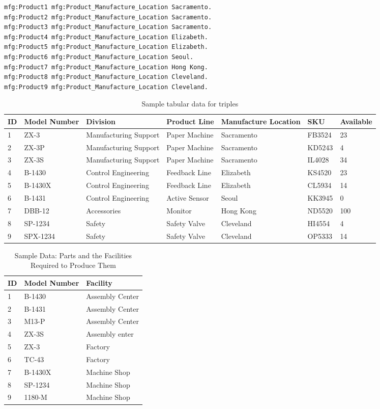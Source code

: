 \begin{lstlisting}
mfg:Product1 mfg:Product_Manufacture_Location Sacramento.
mfg:Product2 mfg:Product_Manufacture_Location Sacramento.
mfg:Product3 mfg:Product_Manufacture_Location Sacramento.
mfg:Product4 mfg:Product_Manufacture_Location Elizabeth.
mfg:Product5 mfg:Product_Manufacture_Location Elizabeth.
mfg:Product6 mfg:Product_Manufacture_Location Seoul.
mfg:Product7 mfg:Product_Manufacture_Location Hong Kong.
mfg:Product8 mfg:Product_Manufacture_Location Cleveland.
mfg:Product9 mfg:Product_Manufacture_Location Cleveland.
\end{lstlisting}


\begin{table}
\label{tab:ch9.1}
\caption{Sample tabular data for triples}
\begin{tabular}{|l l l l l l l|}
\hline
ID&Model Number&Division&Product Line&Manufacture Location&SKU&Available\\
\hline
1&ZX-3&Manufacturing Support&Paper Machine&Sacramento&FB3524&23\\
2&ZX-3P&Manufacturing Support&Paper Machine&Sacramento&KD5243&4\\
3&ZX-3S&Manufacturing Support&Paper Machine&Sacramento&IL4028&34\\
4&B-1430&Control Engineering&Feedback Line&Elizabeth&KS4520&23\\
5&B-1430X&Control Engineering&Feedback Line&Elizabeth&CL5934&14\\
6&B-1431&Control Engineering&Active Sensor&Seoul&KK3945&0\\
7&DBB-12&Accessories&Monitor&Hong Kong&ND5520&100\\
8&SP-1234&Safety&Safety Valve&Cleveland&HI4554&4\\
9&SPX-1234&Safety&Safety Valve&Cleveland&OP5333&14\\
\hline
\end{tabular}
\end{table}

\begin{table}
\label{tab:ch9.2}
\caption{Sample Data: Parts and the Facilities Required to Produce Them}
\begin{tabular}{|l l l|}
\hline
ID&Model Number&Facility\\
\hline
1&B-1430&Assembly Center\\
2&B-1431&Assembly Center\\
3&M13-P&Assembly Center\\
4&ZX-3S&Assembly enter\\
5&ZX-3&Factory\\
6&TC-43&Factory\\
7&B-1430X&Machine Shop\\
8&SP-1234&Machine Shop\\
9&1180-M&Machine Shop\\
\hline
\end{tabular}
\end{table}

